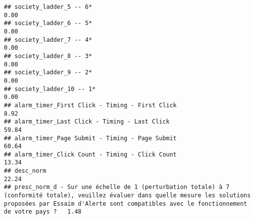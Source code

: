 \documentclass[
]{article}
\begin{document}
\begin{verbatim}
## society_ladder_5 -- 6*                                                                                                                                                                                                       0.00
## society_ladder_6 -- 5*                                                                                                                                                                                                       0.00
## society_ladder_7 -- 4*                                                                                                                                                                                                       0.00
## society_ladder_8 -- 3*                                                                                                                                                                                                       0.00
## society_ladder_9 -- 2*                                                                                                                                                                                                       0.00
## society_ladder_10 -- 1*                                                                                                                                                                                                      0.00
## alarm_timer_First Click - Timing - First Click                                                                                                                                                                               8.92
## alarm_timer_Last Click - Timing - Last Click                                                                                                                                                                                59.84
## alarm_timer_Page Submit - Timing - Page Submit                                                                                                                                                                              60.64
## alarm_timer_Click Count - Timing - Click Count                                                                                                                                                                              13.34
## desc_norm                                                                                                                                                                                                                   22.24
## presc_norm_d - Sur une échelle de 1 (perturbation totale) à 7 (conformité totale), veuillez évaluer dans quelle mesure les solutions proposées par Essaim d'Alerte sont compatibles avec le fonctionnement de votre pays ?   1.48

\end{verbatim}
\end{document}
